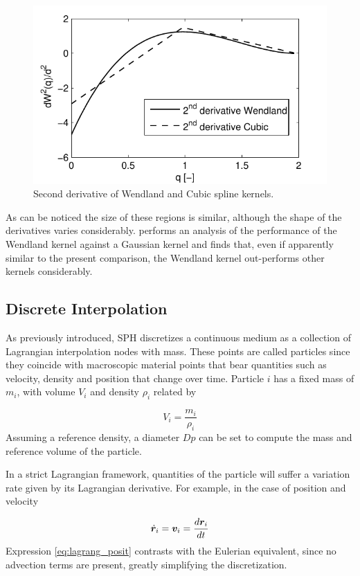 %
\begin{figure}[ht!]
	\centering 
	\includegraphics[width=0.49\linewidth]{Figures/3.Chapter/Kernels_2deriv}
	\caption{Second derivative of Wendland and Cubic spline kernels.}
	\label{fig:kernel_wndland_d2} 
\end{figure}
%
As can be noticed the size of these regions is similar, although the shape of the derivatives varies considerably. \cite{Macia-2011} performs an analysis of the performance of the Wendland kernel against a Gaussian kernel and finds that, even if apparently similar to the present comparison, the Wendland kernel out-performs other kernels considerably.


\subsection{Discrete Interpolation}
\label{Subsec:discrete_interp}

As previously introduced, \ac{SPH} discretizes a continuous medium as a collection of Lagrangian interpolation nodes with mass. These points are called particles since they coincide with macroscopic material points that bear quantities such as velocity, density and position that change over time. Particle $i$ has a fixed mass of $m_i$, with volume $V_i$ and density $\rho_i$ related by

% 
\begin{equation} \label{eq:mass_volume_density}
V_i=\frac{m_i}{\rho_i}
\end{equation}
%
Assuming a reference density, a diameter $Dp$ can be set to compute the mass and reference volume of the particle.

In a strict Lagrangian framework, quantities of the particle will suffer a variation rate given by its Lagrangian derivative. For example, in the case of position and velocity

% 
\begin{equation} \label{eq:lagrang_posit}
\dot{\boldsymbol{r}}_i = \boldsymbol{v}_i = \frac{d\boldsymbol{r}_i}{dt}
\end{equation}
%
Expression \eqref{eq:lagrang_posit} contrasts with the Eulerian equivalent, since no advection terms are present, greatly simplifying the discretization.

